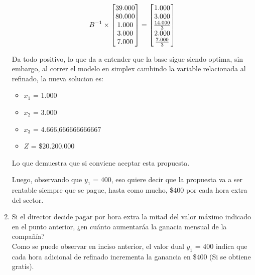 \documentclass[10pt,a4paper]{article}
\begin{document}
\begin{enumerate}
    \[
        B^{-1} \times \begin{bmatrix}
            $39.000$ \\
            $80.000$ \\
            $1.000$  \\
            $3.000$  \\
            $7.000$  \\
        \end{bmatrix} = 
        \begin{bmatrix}
            $1.000$ \\
            $3.000$ \\
            $$\frac{14.000}{3}$$  \\
            $2.000$  \\
            $$\frac{7.000}{3}$$  \\
        \end{bmatrix}
    \]

    Da todo positivo, lo que da a entender que la base sigue siendo optima, sin embargo, al correr el modelo en simplex cambindo la variable relacionada al refinado,
    la nueva solucion es:

    \begin{itemize}

        \item $x_{1}$ = 1.000
        \item $x_{2}$ = 3.000
        \item $x_{3}$ = 4.666,666666666667
        \item $Z$ = \$20.200.000\\

    \end{itemize}

    Lo que demuestra que si conviene aceptar esta propuesta.

    Luego, observando que $y_{1}$ = 400, eso quiere decir que la propuesta va a ser rentable siempre que se pague, hasta como mucho, \$400 por cada hora extra del sector. \\

    
    \item Si el director decide pagar por hora extra la mitad del valor máximo indicado en el punto anterior, ¿en cuánto
    aumentaráa la ganacia mensual de la compañía? \\

    Como se puede observar en inciso anterior, el valor dual $y_{1}$ = 400 indica que cada hora adicional de refinado incrementa la ganancia en \$400 (Si
    se obtiene gratis). \\


\end{enumerate}
\end{document}
